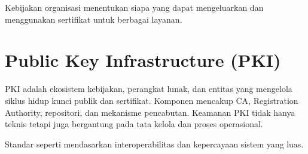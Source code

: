 \documentclass[../main.tex]{subfiles}
\begin{document}
Kebijakan organisasi menentukan siapa yang dapat mengeluarkan dan menggunakan sertifikat untuk berbagai layanan.

\section{Public Key Infrastructure (PKI)}
PKI adalah ekosistem kebijakan, perangkat lunak, dan entitas yang mengelola siklus hidup kunci publik dan sertifikat. Komponen mencakup CA, Registration Authority, repositori, dan mekanisme pencabutan. Keamanan PKI tidak hanya teknis tetapi juga bergantung pada tata kelola dan proses operasional.

Standar seperti \textcite{rfc5280} mendasarkan interoperabilitas dan kepercayaan sistem yang luas.
\end{document}
